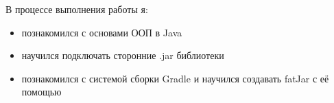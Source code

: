 В процессе выполнения работы я:
\begin{itemize}
	\item познакомился с основами ООП в Java
	\item научился подключать сторонние .jar  библиотеки
	\item познакомился с системой сборки Gradle и научился создавать  fatJar с её помощью
\end{itemize}